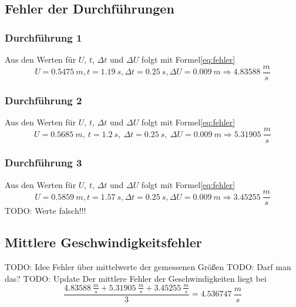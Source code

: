 \documentclass{article}
\begin{document}
        \subsection{Fehler der Durchführungen}
            \subsubsection{Durchführung 1}
                Aus den Werten für \(U\), \(t\), \( \Delta t \) und \(\Delta U \) folgt mit Formel\ref{eq:fehler}
                \begin{equation}
                    U = \SI{0.5475}{m}, t = \SI{1.19}{s}, \Delta t = \SI{0.25}{s}, \Delta U = \SI{0.009}{m} \Rightarrow \SI{4.83588}{\frac{m}{s}} 
                \end{equation}
            \subsubsection{Durchführung 2}
                Aus den Werten für \(U\), \(t\), \( \Delta t \) und \(\Delta U \) folgt mit Formel\ref{eq:fehler}
                \begin{equation}
                    U = \SI{0.5685}{m},\ t = \SI{1.2}{s},\ \Delta t = \SI{0.25}{s},\ \Delta U = \SI{0.009}{m} \Rightarrow \SI{5.31905}{\frac{m}{s}} 
                \end{equation}
            \subsubsection{Durchführung 3}
                Aus den Werten für \(U\), \(t\), \( \Delta t \) und \(\Delta U \) folgt mit Formel\ref{eq:fehler}
                \begin{equation}
                    U = \SI{0.5859}{m}, t = \SI{1.57}{s}, \Delta t = \SI{0.25}{s}, \Delta U = \SI{0.009}{m} \Rightarrow \SI{3.45255}{\frac{m}{s}} 
                \end{equation} TODO: Werte falsch!!!

        \subsection{Mittlere Geschwindigkeitsfehler}
            TODO: Idee Fehler über mittelwerte der gemessenen Größen
            TODO: Darf man das? TODO: Update
            Der mittlere Fehler der Geschwindigkeiten liegt bei
            \begin{equation} \label{val:geschw_fehler}
                \frac{ \SI{4.83588}{\frac{m}{s}} + \SI{5.31905}{\frac{m}{s}} + \SI{3.45255}{\frac{m}{s}} }{3} = \SI{4.536747}{\frac{m}{s}}
            \end{equation}
\end{document}

